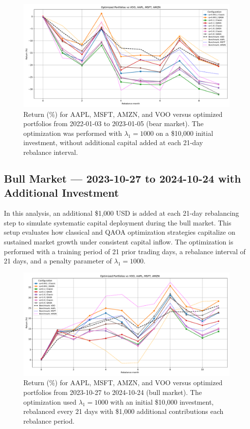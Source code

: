 \documentclass[12pt]{article}
\begin{document}
\begin{figure}[H]
    \centering
    \includegraphics[width=1.0\textwidth]{figures/_VOO_bb_bear_study_post.pdf}
    \caption{Return (\%) for AAPL, MSFT, AMZN, and VOO versus optimized portfolios from 2022-01-03 to 2023-01-05 (bear market). The optimization was performed with $\lambda_{1} = 1000$ on a \$10{,}000 initial investment, without additional capital added at each 21-day rebalance interval.}
    \label{fig:VOO_bb_bear_study}
\end{figure}

\subsection{Bull Market — 2023-10-27 to 2024-10-24 with Additional Investment}

In this analysis, an additional \$1{,}000 USD is added at each 21-day rebalancing step to simulate systematic capital deployment during the bull market. This setup evaluates how classical and QAOA optimization strategies capitalize on sustained market growth under consistent capital inflow. The optimization is performed with a training period of 21 prior trading days, a rebalance interval of 21 days, and a penalty parameter of \(\lambda_1 = 1000\).

\begin{figure}[H]
    \centering
    \includegraphics[width=1.0\textwidth]{figures/_VOO_bb_bull_study_post_new_invest.pdf}
    \caption{Return (\%) for AAPL, MSFT, AMZN, and VOO versus optimized portfolios from 2023-10-27 to 2024-10-24 (bull market). The optimization used $\lambda_{1} = 1000$ with an initial \$10{,}000 investment, rebalanced every 21 days with \$1{,}000 additional contributions each rebalance period.}
    \label{fig:VOO_bb_bull_study_new_invest}
\end{figure}
\end{document}
